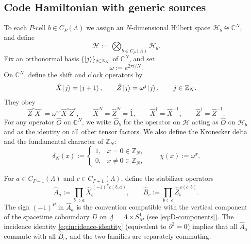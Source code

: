 \subsection{Code Hamiltonian with generic sources}

To each \(P\)-cell \(b\in C_P(\Lambda)\) we assign an \(N\)-dimensional Hilbert space
\(\mathcal H_b\cong\mathbb C^N\), and define
\begin{equation}
	\mathcal H
	:=
	\bigotimes_{b\in C_P(\Lambda)}\mathcal H_b .
	\label{eq:H-total}
\end{equation}
Fix an orthonormal basis \(\{\ket{j}\}_{j\in\mathbb Z_N}\) of \(\mathbb C^N\), and set
\begin{equation}
\omega:=e^{2\pi i/N}.
\end{equation}
On \(\mathbb C^N\), define the shift and clock operators by
\begin{equation}
	\hat X\ket{j}=\ket{j+1},
	\qquad
	\hat Z\ket{j}=\omega^j\ket{j},
	\qquad
	j\in\mathbb Z_N.
	\label{eq:XZ}
\end{equation}
They obey
\begin{equation}
	\hat Z^r\hat X^s=\omega^{rs}\hat X^s\hat Z^r,
	\qquad
	\hat X^N=\hat Z^N=\hat 1,
	\qquad
	\hat X^\dagger=\hat X^{-1},
	\qquad
	\hat Z^\dagger=\hat Z^{-1}.
	\label{eq:Weyl}
\end{equation}
For any operator \(\hat O\) on \(\mathbb C^N\), we write \(\hat O_b\) for the operator on
\(\mathcal H\) acting as \(\hat O\) on \(\mathcal H_b\) and as the identity on all other
tensor factors. We also define the Kronecker delta and the fundamental character of $\mathbb Z_N$:
\begin{equation}
	\delta_N(x)
	:=
	\begin{cases}
		1,& x=0\in\mathbb Z_N,\\
		0,& x\neq0\in\mathbb Z_N,
	\end{cases}
	\qquad
	\chi(x):=\omega^x .
	\label{eq:delta-and-character}
\end{equation}

For \(a\in C_{P-1}(\Lambda)\) and \(c\in C_{P+1}(\Lambda)\), define the stabilizer operators
\begin{equation}
	\hat A_a
	:=
	\prod_{b\supset a}\hat X_b^{\,(-1)^P\varepsilon(b,a)},
	\qquad
	\hat B_c
	:=
	\prod_{b\subset c}\hat Z_b^{\,\varepsilon(c,b)} .
	\label{eq:AB}
\end{equation}
The sign \((-1)^P\) in \(\hat A_a\) is the convention compatible with the vertical
component of the spacetime coboundary \(D\) on \(\underline\Lambda=\Lambda\times S^1_M\) (see \eqref{eq:D-components}). The incidence identity \eqref{eq:incidence-identity} (equivalent to \(\partial^2=0\)) implies
that all \(\hat A_a\) commute with all \(\hat B_c\), and the two families are separately
commuting.

